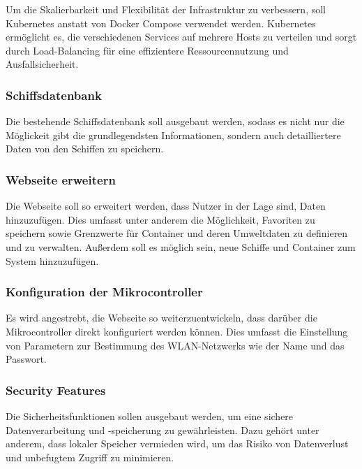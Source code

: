 \documentclass[
    headings=optiontotocandhead,%
    twoside,
    numbers=noenddot,%
    12pt, %
    titlepage, %
    parskip=full, %
    listof=leveldown, 
    numbers=noenddot, %
    a4paper,DIV=14,
    BCOR=15mm,
]{scrbook}
\begin{document}
Um die Skalierbarkeit und Flexibilität der Infrastruktur zu verbessern,
soll Kubernetes anstatt von Docker Compose verwendet werden. Kubernetes
ermöglicht es, die verschiedenen Services auf mehrere Hosts zu verteilen
und sorgt durch Load-Balancing für eine effizientere Ressourcennutzung
und Ausfallsicherheit.

\hypertarget{schiffsdatenbank}{%
\subsubsection{Schiffsdatenbank}\label{schiffsdatenbank}}

Die bestehende Schiffsdatenbank soll ausgebaut werden, sodass es nicht
nur die Möglickeit gibt die grundlegendsten Informationen, sondern auch
detailliertere Daten von den Schiffen zu speichern.

\hypertarget{webseite-erweitern}{%
\subsubsection{Webseite erweitern}\label{webseite-erweitern}}

Die Webseite soll so erweitert werden, dass Nutzer in der Lage sind,
Daten hinzuzufügen. Dies umfasst unter anderem die Möglichkeit,
Favoriten zu speichern sowie Grenzwerte für Container und deren
Umweltdaten zu definieren und zu verwalten. Außerdem soll es möglich
sein, neue Schiffe und Container zum System hinzuzufügen.

\hypertarget{konfiguration-der-mikrocontroller}{%
\subsubsection{Konfiguration der
Mikrocontroller}\label{konfiguration-der-mikrocontroller}}

Es wird angestrebt, die Webseite so weiterzuentwickeln, dass darüber die
Mikrocontroller direkt konfiguriert werden können. Dies umfasst die
Einstellung von Parametern zur Bestimmung des WLAN-Netzwerks wie der
Name und das Passwort.

\hypertarget{security-features}{%
\subsubsection{Security Features}\label{security-features}}

Die Sicherheitsfunktionen sollen ausgebaut werden, um eine sichere
Datenverarbeitung und -speicherung zu gewährleisten. Dazu gehört unter
anderem, dass lokaler Speicher vermieden wird, um das Risiko von
Datenverlust und unbefugtem Zugriff zu minimieren.
\end{document}

